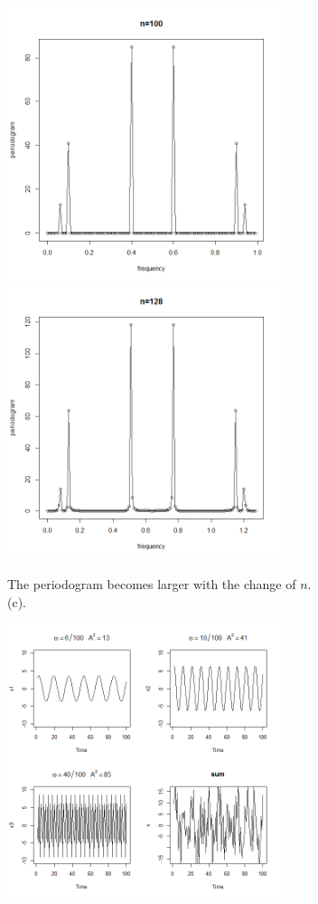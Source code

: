 \documentclass{article}
\begin{document}
\begin{CJK*}{GBK}{song}
\begin{enumerate}
\begin{center}
	\includegraphics[width=8cm]{3.png}
	\includegraphics[width=8cm]{4.png}
	\end{center}
	The periodogram becomes larger with the change of $n$.\\
	(c).\begin{center}
	\includegraphics[width=8cm]{5.png}

\end{center}
\end{enumerate}
\end{CJK*}
\end{document}
